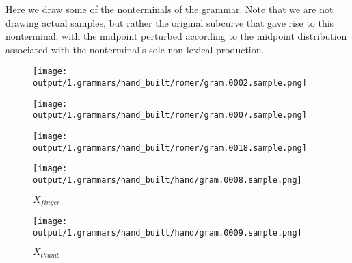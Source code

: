 Here we draw some of the nonterminals of the grammar. Note that we are
not drawing actual samples, but rather the original subcurve that gave
rise to this nonterminal, with the midpoint perturbed according to the
midpoint distribution associated with the nonterminal's sole non-lexical
production.

\begin{figure}
\texttt{[image: output/1.grammars/hand\_built/romer/gram.0002.sample.png]}
\end{figure}

\begin{figure}
\texttt{[image: output/1.grammars/hand\_built/romer/gram.0007.sample.png]}
\end{figure}

\begin{figure}
\texttt{[image: output/1.grammars/hand\_built/romer/gram.0018.sample.png]}
\end{figure}


\begin{figure}
\texttt{[image: output/1.grammars/hand\_built/hand/gram.0008.sample.png]}
\caption{$X_{finger}$}
\end{figure}

\begin{figure}
\texttt{[image: output/1.grammars/hand\_built/hand/gram.0009.sample.png]}
\caption{$X_{thumb}$}
\end{figure}

\FloatBarrier



